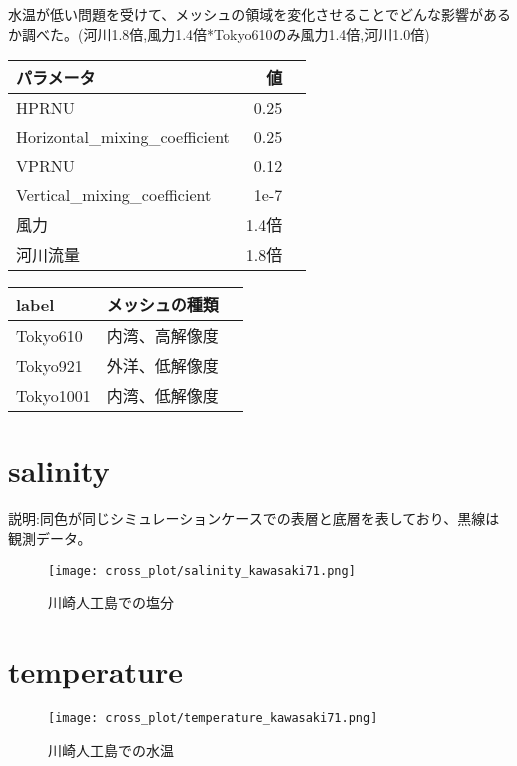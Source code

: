 \documentclass[fontsize=12pt,paper=a4]{jlreq}
\begin{document}
水温が低い問題を受けて、メッシュの領域を変化させることでどんな影響があるか調べた。(河川1.8倍,風力1.4倍*Tokyo610のみ風力1.4倍,河川1.0倍)


\begin{table}
  \begin{minipage}[hbtp]{0.5\hsize}
    \begin{tabular}{lrr} \toprule
      パラメータ & 値 \\ \midrule
      HPRNU & 0.25\\
      Horizontal\_mixing\_coefficient & 0.25\\
      VPRNU & 0.12\\
      Vertical\_mixing\_coefficient & 1e-7\\
      風力　& 1.4倍\\
      河川流量 & 1.8倍\\ \bottomrule
    \end{tabular}
  \end{minipage}
  \begin{minipage}[hbtp]{0.45\hsize}
    \begin{tabular}{lrr} \toprule
      label & メッシュの種類 \\ \midrule
      Tokyo610 & 内湾、高解像度\\
      Tokyo921 & 外洋、低解像度\\
      Tokyo1001 & 内湾、低解像度\\ \bottomrule
    \end{tabular}
  \end{minipage}
\end{table}


\section{salinity}
説明:同色が同じシミュレーションケースでの表層と底層を表しており、黒線は観測データ。
\begin{figure}[hbtp]
        \centering
        \texttt{[image: cross\_plot/salinity\_kawasaki71.png]}
        \caption{川崎人工島での塩分}
  \end{figure}



\section{temperature}
  \begin{figure}[hbtp]
        \centering
        \texttt{[image: cross\_plot/temperature\_kawasaki71.png]}
        \caption{川崎人工島での水温}
  
  \end{figure}
\end{document}
